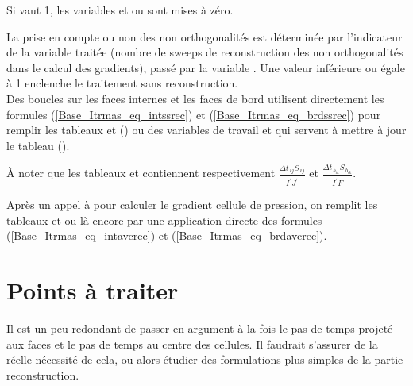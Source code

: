 Si  vaut 1, les variables  et  ou 
sont mises \`a z\'ero.

La prise en compte ou non des non orthogonalit\'es est d\'etermin\'ee par
l'indicateur  de la variable trait\'ee (nombre de sweeps de
reconstruction des non orthogonalit\'es dans le calcul des gradients), pass\'e
par la variable . Une valeur inf\'erieure ou \'egale \`a 1 enclenche
le traitement sans reconstruction.\\
Des boucles sur les faces internes et les faces de bord utilisent directement
les formules (\ref{Base_Itrmas_eq_intssrec}) et (\ref{Base_Itrmas_eq_brdssrec}) pour remplir les
tableaux  et  () ou des variables de
travail  et  qui servent \`a mettre \`a jour le tableau
 ().

\`A noter que les tableaux  et  contiennent respectivement
$\displaystyle\frac{\Delta t_{\,ij}S_{\,ij}}{\overline{I^\prime J^\prime}}$ et
$\displaystyle\frac{\Delta t_{\,b_{ik}}S_{\,b_{ik}}}{\overline{I^\prime F}}$.

Apr\`es un appel \`a  pour calculer le gradient cellule de
pression, on remplit les tableaux  et  ou 
l\`a encore par une application directe des formules (\ref{Base_Itrmas_eq_intavcrec}) et
(\ref{Base_Itrmas_eq_brdavcrec}).

\section*{Points \`a traiter}
Il est un peu redondant de passer en argument \`a la fois le pas de temps
projet\'e aux faces et le pas de temps au centre des cellules. Il faudrait
s'assurer de la r\'eelle n\'ecessit\'e de cela, ou alors \'etudier des
formulations plus simples de la partie reconstruction.

